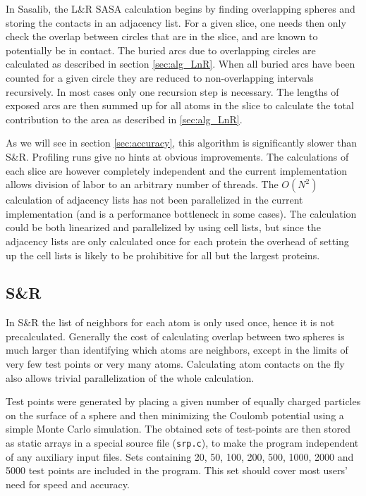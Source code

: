 \documentclass[a4paper,11pt]{article}
\begin{document}
In Sasalib, the L\&R SASA calculation begins by finding overlapping
spheres and storing the contacts in an adjacency list. For a given
slice, one needs then only check the overlap between circles that are
in the slice, and are known to potentially be in contact. The buried
arcs due to overlapping circles are calculated as described in section
\ref{sec:alg_LnR}. When all buried arcs have been counted for a given
circle they are reduced to non-overlapping intervals recursively. In
most cases only one recursion step is necessary. The lengths of
exposed arcs are then summed up for all atoms in the slice to
calculate the total contribution to the area as described in
\ref{sec:alg_LnR}.

As we will see in section \ref{sec:accuracy}, this algorithm is
significantly slower than S\&R. Profiling runs give no hints at
obvious improvements. The calculations of each slice are however
completely independent and the current implementation allows division
of labor to an arbitrary number of threads. The $O(N^2)$ calculation
of adjacency lists has not been parallelized in the current
implementation (and is a performance bottleneck in some cases). The
calculation could be both linearized and parallelized by using cell
lists, but since the adjacency lists are only calculated once for each
protein the overhead of setting up the cell lists is likely to be
prohibitive for all but the largest proteins.

\subsection{S\&R}

In S\&R the list of neighbors for each atom is only used once, hence
it is not precalculated. Generally the cost of calculating overlap
between two spheres is much larger than identifying which atoms are
neighbors, except in the limits of very few test points or very many
atoms. Calculating atom contacts on the fly also allows trivial
parallelization of the whole calculation.

Test points were generated by placing a given number of equally
charged particles on the surface of a sphere and then minimizing the
Coulomb potential using a simple Monte Carlo simulation. The obtained
sets of test-points are then stored as static arrays in a special
source file (\texttt{srp.c}), to make the program independent of any
auxiliary input files. Sets containing 20, 50, 100, 200, 500, 1000,
2000 and 5000 test points are included in the program. This set should
cover most users' need for speed and accuracy.
\end{document}
